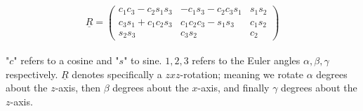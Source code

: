 \begin{equation}
    \underline{R}=\left(\begin{matrix}
    c_1c_3-c_2s_1s_3 & -c_1s_3-c_2c_3s_1 & s_1s_2 \\
    c_3s_1+c_1c_2s_3 & c_1c_2c_3-s_1s_3 & c_1s_2 \\
    s_2s_3 & c_3s_2 & c_2
    \end{matrix}\right)
\label{eq:defineR}
\end{equation}
\\
"$c$" refers to a cosine and "$s$" to sine. {$1,2,3$} refers to the Euler angles {$\alpha,\beta,\gamma$} respectively. $\underline{R}$ denotes specifically a $zxz$-rotation; meaning we rotate $\alpha$ degrees about the $z$-axis, then $\beta$ degrees about the $x$-axis, and finally $\gamma$ degrees about the $z$-axis. 